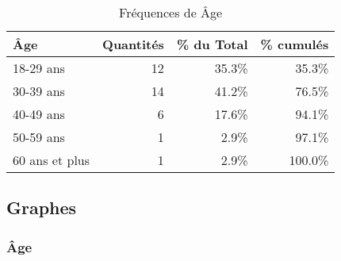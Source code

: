 \documentclass[a4paper,man,hidelinks,floatsintext,x11names]{apa7}
\begin{document}
\begin{table}[!htbp]
\caption{Fréquences de Âge}
\label{tab:Table_4}
\begin{adjustbox}{max size={\columnwidth}{\textheight}}
\centering
\begin{tabular}{lrrr}
\toprule
Âge            & Quantités & \% du Total & \% cumulés \\
\midrule
18-29 ans      &        12 &      35.3\% &     35.3\% \\
30-39 ans      &        14 &      41.2\% &     76.5\% \\
40-49 ans      &         6 &      17.6\% &     94.1\% \\
50-59 ans      &         1 &       2.9\% &     97.1\% \\
60 ans et plus &         1 &       2.9\% &    100.0\% \\
\bottomrule
\end{tabular}
\end{adjustbox}
\begin{tablenotes} {
\small
}
\end{tablenotes}
\end{table}


      
        
      
    
      
      
    
      
        
      
    
\subsection{Graphes}

      
        
      
    
\subsubsection{Âge}

      
        
      
    
      
      
\end{document}

